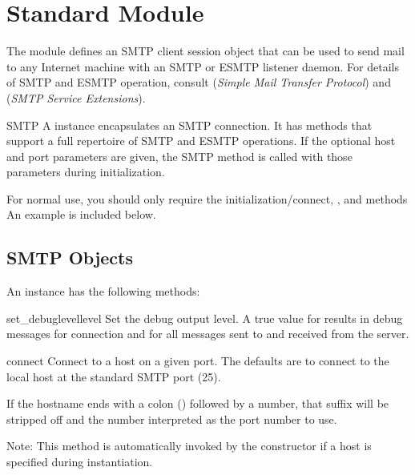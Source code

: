 \section{Standard Module }



The  module defines an SMTP client session object that
can be used to send mail to any Internet machine with an SMTP or ESMTP
listener daemon.  For details of SMTP and ESMTP operation, consult
 (\emph{Simple Mail Transfer Protocol}) and 
(\emph{SMTP Service Extensions}).

\begin{classdesc}{SMTP}{}
A  instance encapsulates an SMTP connection.  It has
methods that support a full repertoire of SMTP and ESMTP
operations. If the optional host and port parameters are given, the
SMTP  method is called with those parameters during
initialization.

For normal use, you should only require the initialization/connect,
, and  methods  An example is
included below.
\end{classdesc}


\subsection{SMTP Objects}
\label{SMTP-objects}

An  instance has the following methods:

\begin{methoddesc}{set_debuglevel}{level}
Set the debug output level.  A true value for  results in
debug messages for connection and for all messages sent to and
received from the server.
\end{methoddesc}

\begin{methoddesc}{connect}{}
Connect to a host on a given port.  The defaults are to connect to the 
local host at the standard SMTP port (25).

If the hostname ends with a colon (\character{:}) followed by a
number, that suffix will be stripped off and the number interpreted as 
the port number to use.

Note:  This method is automatically invoked by the constructor if a
host is specified during instantiation.
\end{methoddesc}

